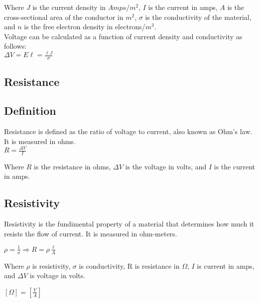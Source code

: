 \documentclass[12pt]{article}
\begin{document}
Where $J$ is the current density in $Amps/m^2$, $I$ is the current in amps, $A$ is the cross-sectional 
area of the conductor in $m^2$, $\sigma$ is the conductivity of the material, and $n$ is the free electron 
density in electrons/$m^3$.\\

Voltage can be calculated as a function of current density and conductivity as follows:\\
\vbox{
    \large\center
    $\Delta V = E\ell = \frac{\ell J}{\sigma}$
}
\vspace{12pt}
\hrulefill

\begin{center}
\section{Resistance}
\end{center}

\subsection*{Definition}
Resistance is defined as the ratio of voltage to current, also known as Ohm's law. It is measured in ohms.\\

\vbox{
    \large\center
    $R = \frac{\Delta V}{I}$
}\vspace{12pt}

Where $R$ is the resistance in ohms, $\Delta V$ is the voltage in volts, and $I$ is the current in amps.\\


\subsection*{Resistivity}

\hspace{.5cm} Resistivity is the fundimental property of a material that determines how much it resists the flow of current. 
It is measured in ohm-meters.

\vbox {
    \large\center
    $\rho = \frac{1}{\sigma} \Rightarrow R = \rho \frac{\ell}{A}$
}\vspace{12pt}

Where $\rho$ is resistivity, $\sigma$ is conductivity, R is resistance in $\Omega$, $I$ is current in amps, and $\Delta V$ is voltage in volts.

\vbox {
    \large\center
    $[\Omega] = [\frac{V}{A}]$
}\vspace{12pt}
\end{document}
